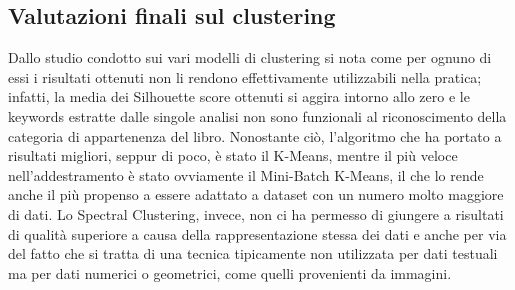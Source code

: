 \documentclass[12pt,oneside]{article}
\begin{document}
    \begin{enumerate}
    \subsection{Valutazioni finali sul clustering}
    \begin{justify}
        Dallo studio condotto sui vari modelli di clustering si nota come per ognuno di essi i risultati ottenuti non li rendono effettivamente utilizzabili nella pratica; infatti, la media dei Silhouette score ottenuti si aggira intorno allo zero e le keywords estratte dalle singole analisi non sono funzionali al riconoscimento della categoria di appartenenza del libro. 
        Nonostante ciò, l’algoritmo che ha portato a risultati migliori, seppur di poco, è stato il K-Means, mentre il più veloce nell’addestramento è stato ovviamente il Mini-Batch K-Means, il che lo rende anche il più propenso a essere adattato a dataset con un numero molto maggiore di dati.
        Lo Spectral Clustering, invece, non ci ha permesso di giungere a risultati di qualità superiore a causa della rappresentazione stessa dei dati e anche per via del fatto che si tratta di una tecnica tipicamente non utilizzata per dati testuali ma per dati numerici o geometrici, come quelli provenienti da immagini.
    \end{justify}
    \end{enumerate}
\end{document}
